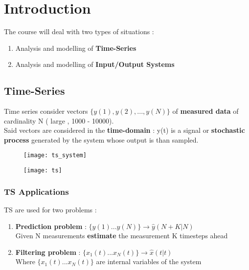 
\section{Introduction}
The course will deal with two types of situations :
\begin{enumerate}
\item Analysis and modelling of \textbf{Time-Series}
\item Analysis and modelling of \textbf{Input/Output Systems}
\end{enumerate}

\subsection{Time-Series} 
Time series consider vectors  $\{y(1), y(2) , ... , y(N)\}$  of \textbf{measured data} of cardinality N ( large , 1000 - 10000).\\
Said vectors are considered in the \textbf{time-domain} : y(t) is a signal or \textbf{stochastic process} generated by the system whose output is than sampled.

\begin{figure}[!h]
\begin{minipage}{.5\textwidth}
  \centering
  \texttt{[image: ts\_system]}
\end{minipage}%
  \begin{minipage}{.5\textwidth}
  \centering
  \texttt{[image: ts]}
\end{minipage}%
\end{figure}

\subsubsection{TS Applications}
TS are used for two problems : 
\begin{enumerate}
\item \textbf{Prediction problem} : $\{ y(1) ... y(N) \} \rightarrow \hat{y}(N+K|N)$ \\ Given N measurements \textbf{estimate} the measurement K timesteps ahead
\item \textbf{Filtering problem} : $\{ x_1(t) ... x_N(t) \} \rightarrow \hat{x} (t|t)$ \\Where $\{ x_1(t) ... x_N(t) \}$ are internal variables of the system
\end{enumerate}
\vfill

